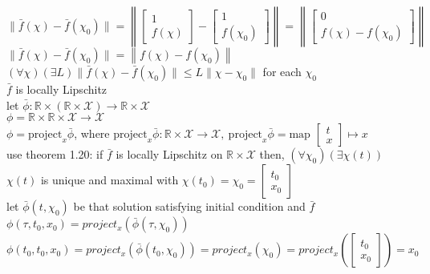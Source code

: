 \documentclass[12pt,letter]{article}
\newcommand{\R}{\mathbb{R}}
\begin{document}
\begin{itemize}
  $\|\bar{f}(\chi)-\bar{f}(\chi_0)\|=\left\|\begin{bmatrix}1 \\ f(\chi)\end{bmatrix}-\begin{bmatrix}1 \\ f(\chi_0)\end{bmatrix}\right\|=\left\|\begin{bmatrix}0 \\ f(\chi)-f(\chi_0)\end{bmatrix}\right\|$\\
  $\|\bar{f}(\chi)-\bar{f}(\chi_0)\|=\left\|f(\chi)-f(\chi_0)\right\|$\\
  $(\forall \chi)(\exists L)\|\bar{f}(\chi)-\bar{f}(\chi_0)\| \leq L \|\chi-\chi_0\|$ for each $\chi_0$\\

  $\bar{f}$ is locally Lipschitz\\

  let $\bar{\phi}: \R \times (\R \times \mathcal{X}) \rightarrow \R \times \mathcal{X}$\\
  $\phi = \R \times \R \times \mathcal{X} \rightarrow \mathcal{X}$\\
  $\phi = \text{project}_x \bar{\phi}$, where $\text{project}_x \bar{\phi}: \R \times \mathcal{X} \rightarrow \mathcal{X},\ \text{project}_x \bar{\phi}=\text{map } \begin{bmatrix}t \\ x\end{bmatrix} \mapsto x$\\

  use theorem 1.20: if $\bar{f}$ is locally Lipschitz on $\R \times \mathcal{X}$ then, $(\forall \chi_0)(\exists \chi(t))$ $\chi(t)$ is unique and maximal with $\chi(t_0)=\chi_0=\begin{bmatrix}t_0\\x_0\end{bmatrix}$\\
  
  let $\bar\phi(t,\chi_0)$ be that solution satisfying initial condition and $\bar{f}$\\

  $\phi(\tau,t_0,x_0)=project_x(\bar{\phi}(\tau,\chi_0))$\\

  $\phi(t_0,t_0,x_0)=project_x(\bar{\phi}(t_0,\chi_0))=project_x(\chi_0)=project_x(\begin{bmatrix}t_0\\x_0\end{bmatrix})=x_0$\\


\end{itemize}
\end{document}
